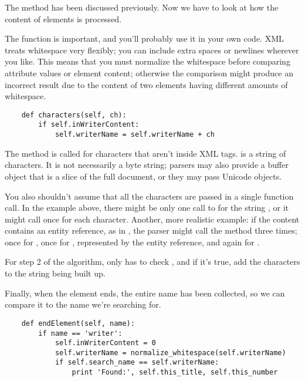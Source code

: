 \documentclass{howto}
\newcommand{\element}[1]{\code{#1}}
\begin{document}
The  method has been discussed previously.  Now
we have to look at how the content of elements is processed.  

The  function is important, and
you'll probably use it in your own code.  XML treats whitespace very
flexibly; you can include extra spaces or newlines wherever you like.
This means that you must normalize the whitespace before comparing
attribute values or element content; otherwise the comparison might
produce an incorrect result due to the content of two elements having
different amounts of whitespace.

\begin{verbatim}
    def characters(self, ch):
        if self.inWriterContent:
            self.writerName = self.writerName + ch
\end{verbatim}

The  method is called for characters that aren't
inside XML tags.   is a string of characters. It is not
necessarily a byte string; parsers may also provide a buffer object
that is a slice of the full document, or they may pass Unicode
objects.

You also shouldn't assume that all the characters are passed in a
single function call.  In the example above, there might be only one
call to  for the string , or
it might call  once for each character.  Another,
more realistic example: if the content contains an entity reference,
as in , the parser might call the method
three times; once for , once for \samp{\&}, represented
by the entity reference, and again for .

For step 2 of the algorithm,  only has to
check , and if it's true, add the characters to
the string being built up.

Finally, when the \element{writer} element ends, the entire name has
been collected, so we can compare it to the name we're searching for.

\begin{verbatim}
    def endElement(self, name):
        if name == 'writer':
            self.inWriterContent = 0
            self.writerName = normalize_whitespace(self.writerName)
            if self.search_name == self.writerName:
                print 'Found:', self.this_title, self.this_number
\end{verbatim}
\end{document}
